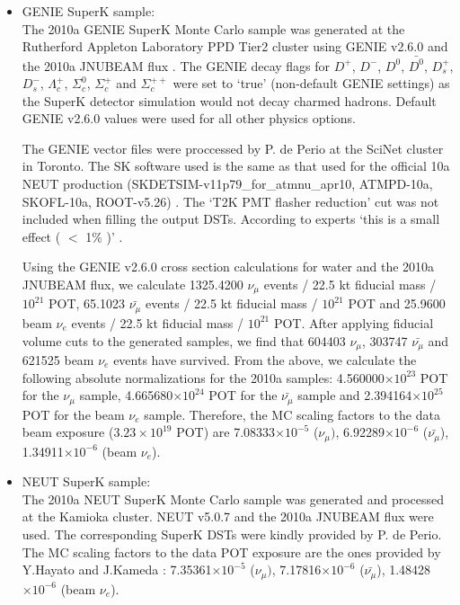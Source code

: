 \begin{itemize}
\item
GENIE SuperK sample:\\
 The 2010a GENIE SuperK Monte Carlo sample was generated at the Rutherford Appleton Laboratory
 PPD Tier2 cluster using GENIE v2.6.0 and the 2010a JNUBEAM flux \cite{BeamFlux10a}.
 The GENIE decay flags for $D^{+}$, $D^{-}$, $D^{0}$, $\bar{D^{0}}$, $D_{s}^{+}$, $D_{s}^{-}$,
 $\Lambda_{c}^{+}$, $\Sigma_{c}^{0}$, $\Sigma_{c}^{+}$ and $\Sigma_{c}^{++}$ 
 were set to `true' (non-default GENIE settings) as the SuperK detector simulation would not
 decay charmed hadrons. Default GENIE v2.6.0 values were used for all other physics options.

 The GENIE vector files were proccessed by P. de Perio at the SciNet cluster in Toronto.
 The SK software used is the same as that used for the official 10a NEUT production
 (SKDETSIM-v11p79\_for\_atmnu\_apr10, ATMPD-10a, SKOFL-10a, ROOT-v5.26) \cite{PatrickPrivComm}.
 The `T2K PMT flasher reduction' cut was not included when filling the output DSTs.
 According to experts `this is a small effect ( $<$ 1\% )' \cite{SuperKFC}.

 Using the GENIE v2.6.0 cross section calculations for water and the 2010a JNUBEAM flux,
 we calculate
 1325.4200 $\nu_{\mu}$       events / 22.5 kt fiducial mass / $10^{21}$ POT,
   65.1023 $\bar{\nu_{\mu}}$ events / 22.5 kt fiducial mass / $10^{21}$ POT and
   25.9600 beam $\nu_{e}$    events / 22.5 kt fiducial mass / $10^{21}$ POT.
 After applying fiducial volume cuts to the generated samples, we find that
   604403 $\nu_{\mu}$,
   303747 $\bar{\nu_{\mu}}$ and
   621525 beam $\nu_{e}$  
 events have survived.
 From the above, we calculate the following absolute normalizations 
 for the 2010a samples:
   4.560000$\times10^{23}$ POT for the $\nu_{\mu}$ sample,
   4.665680$\times10^{24}$ POT for the $\bar{\nu_{\mu}}$ sample and
   2.394164$\times10^{25}$ POT for the beam $\nu_{e}$ sample.
 Therefore, the MC scaling factors to the data beam exposure ($3.23\times10^{19}$ POT) are
   7.08333$\times10^{-5}$ ($\nu_{\mu})$,
   6.92289$\times10^{-6}$ ($\bar{\nu_{\mu}}$),
   1.34911$\times10^{-6}$ (beam $\nu_{e}$). 
   
\item
NEUT SuperK sample:\\
 The 2010a NEUT SuperK Monte Carlo sample was generated and processed at the Kamioka cluster.
 NEUT v5.0.7 and the 2010a JNUBEAM flux were used.
 The corresponding SuperK DSTs were kindly provided by P. de Perio.
 The MC scaling factors to the data POT exposure are the ones provided by Y.Hayato and J.Kameda \cite{KamedaPrivComm}:
   7.35361$\times10^{-5}$ ($\nu_{\mu})$,
   7.17816$\times10^{-6}$ ($\bar{\nu_{\mu}}$),
   1.48428$\times10^{-6}$ (beam $\nu_{e}$). 

\end{itemize}

